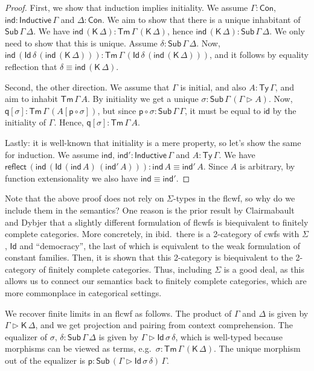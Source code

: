 \documentclass[12pt,a4paper,twoside,openany]{book}
\theoremstyle{remark}
\theoremstyle{definition}
\theoremstyle{theorem}
\newcommand{\ms}[1]{\mathsf{#1}}
\newcommand{\reflect}{\mathsf{reflect}}
\newcommand{\id}{\mathsf{id}}
\newcommand{\Con}{\mathsf{Con}}
\newcommand{\Sub}{\mathsf{Sub}}
\newcommand{\Tm}{\mathsf{Tm}}
\newcommand{\Ty}{\mathsf{Ty}}
\newcommand{\Id}{\mathsf{Id}}
\newcommand{\ext}{\triangleright}
\newcommand{\p}{\mathsf{p}}
\newcommand{\q}{\mathsf{q}}
\newcommand{\K}{\mathsf{K}}
\begin{document}
\begin{proof}
First, we show that induction implies initiality. We assume $\Gamma : \Con$,
$\ms{ind} : \ms{Inductive}\,\Gamma$ and $\Delta : \Con$. We aim to show that
there is a unique inhabitant of $\Sub\,\Gamma\,\Delta$. We have
$\ms{ind}\,(\K\,\Delta) : \Tm\,\Gamma\,(\K\,\Delta)$, hence
$\ms{ind}\,(\K\,\Delta) : \Sub\,\Gamma\,\Delta$. We only need to show that this
is unique.  Assume $\delta : \Sub\,\Gamma\,\Delta$. Now,
$\ms{ind}\,(\Id\,\delta\,(\ms{ind}\,(\K\,\Delta))) :
\Tm\,\Gamma\,(\Id\,\delta\,(\ms{ind}\,(\K\,\Delta)))$, and it follows by
equality reflection that $\delta \equiv \ms{ind}\,(\K\,\Delta)$.

Second, the other direction. We assume that $\Gamma$ is initial, and also $A :
\Ty\,\Gamma$, and aim to inhabit $\Tm\,\Gamma\,A$. By initiality we get a unique
$\sigma : \Sub\,\Gamma\,(\Gamma \ext A)$. Now, $\q[\sigma] : \Tm\,\Gamma\,(A[\p \circ \sigma])$,
but since $\p \circ \sigma : \Sub\,\Gamma\,\Gamma$, it must be equal to $\id$ by the initiality
of $\Gamma$. Hence, $\q[\sigma] : \Tm\,\Gamma\,A$.

Lastly: it is well-known that initiality is a mere property, so let's show the
same for induction.  We assume $\ms{ind},\,\ms{ind'} : \ms{Inductive}\,\Gamma$
and $A : \Ty\,\Gamma$. We have
$\reflect\,(\ms{ind}\,(\Id\,(\ms{ind}\,A)\,(\ms{ind'}\,A))) : \ms{ind}\,A \equiv
\ms{ind'}\,A$. Since $A$ is arbitrary, by function extensionality we also have $\ms{ind} \equiv \ms{ind'}$.
\end{proof}

Note that the above proof does not rely on $\Sigma$-types in the flcwf, so why
do we include them in the semantics? One reason is the prior result by
Clairmabault and Dybjer \cite{clairambault2014biequivalence} that a slightly
different formulation of flcwfs is biequivalent to finitely complete
categories. More concretely, in ibid.\ there is a 2-category of cwfs with
$\Sigma$, $\Id$ and ``democracy'', the last of which is equivalent to the weak
formulation of constant families. Then, it is shown that this 2-category is
biequivalent to the 2-category of finitely complete categories. Thus, including
$\Sigma$ is a good deal, as this allows us to connect our semantics back to
finitely complete categories, which are more commonplace in categorical
settings.

We recover finite limits in an flcwf as follows. The product of $\Gamma$ and
$\Delta$ is given by $\Gamma \ext \K\,\Delta$, and we get projection and pairing
from context comprehension. The equalizer of $\sigma,\,\delta :
\Sub\,\Gamma\,\Delta$ is given by $\Gamma \ext \Id\,\sigma\,\delta$, which is
well-typed because morphisms can be viewed as terms, e.g.\ $\sigma :
\Tm\,\Gamma\,(\K\,\Delta)$. The unique morphism out of the equalizer is $\p :
\Sub\,(\Gamma \ext \Id\,\sigma\,\delta)\,\Gamma$.
\end{document}
